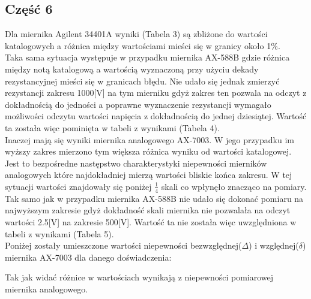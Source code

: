 \documentclass[11pt]{article}
\begin{document}
    \subsection*{Część 6}
    Dla miernika Agilent 34401A wyniki (Tabela 3) są zbliżone
    do wartości katalogowych a różnica między wartościami mieści się w granicy około 1\%.\\
    \indent Taka sama sytuacja występuje w przypadku miernika AX-588B gdzie
    różnica między notą katalogową a wartością wyznaczoną przy użyciu dekady rezystancyjnej mieści się w granicach błędu.
    Nie udało się jednak zmierzyć rezystancji zakresu 1000[V] na
    tym mierniku gdyż zakres ten pozwala na odczyt z dokładnością do jedności
    a poprawne wyznaczenie rezystancji wymagało możliwości odczytu wartości napięcia z dokładnością do jednej dziesiątej.
    Wartość ta została więc pominięta w tabeli z wynikami (Tabela 4).\\
    \indent Inaczej mają się wyniki miernika analogowego AX-7003. W jego przypadku
    im wyższy zakres mierzono tym większa różnica wyniku od wartości katalogowej.
    Jest to bezpośredne następstwo charakterystyki niepewności mierników analogowych
    które najdokładniej mierzą wartości bliskie końca zakresu.
    W tej sytuacji wartości znajdowały się poniżej $\frac{1}{4}$ skali co wpłynęło znacząco na pomiary.
    Tak samo jak w przypadku miernika AX-588B nie udało się dokonać
    pomiaru na najwyższym zakresie gdyż dokładność skali miernika nie pozwalała na odczyt wartości 2.5[V] na zakresie 500[V].
    Wartość ta nie została więc uwzględniona w tabeli z wynikami (Tabela 5).\\
    \indent Poniżej zostały umieszczone wartości niepewności bezwzględnej($\Delta$) i względnej($\delta$) miernika AX-7003 dla danego doświadczenia:
    \begin{center}
    \end{center}
    Tak jak widać różnice w wartościach wynikają z niepewności pomiarowej miernika analogowego.

    \newpage
\end{document}
